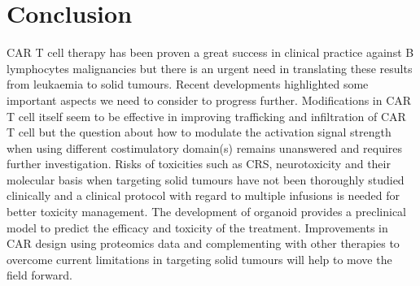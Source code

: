 \documentclass[12pt,oneside]{report}
\begin{document}
\section{Conclusion}
CAR T cell therapy has been proven a great success in clinical practice against B lymphocytes malignancies but there is an urgent need in translating these results from leukaemia to solid tumours. Recent developments highlighted some important aspects we need to consider to progress further. Modifications in CAR T cell itself seem to be effective in improving trafficking and infiltration of CAR T cell but the question about how to modulate the activation signal strength when using different costimulatory domain(s) remains unanswered and requires further investigation. Risks of toxicities such as CRS, neurotoxicity and their molecular basis when targeting solid tumours have not been thoroughly studied clinically and a clinical protocol with regard to multiple infusions is needed for better toxicity management. The development of organoid provides a preclinical model to predict the efficacy and toxicity of the treatment. Improvements in CAR design using proteomics data and complementing with other therapies to overcome current limitations in targeting solid tumours will help to move the field forward.



\end{document}
